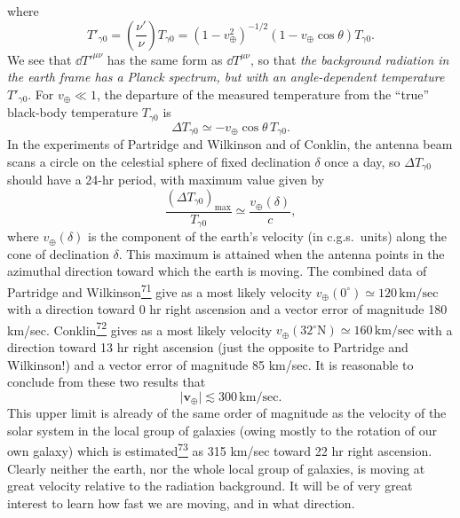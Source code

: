 where
\begin{equation}
  T'_{\gamma0}
  =
  \left(\frac{\nu'}{\nu}\right)T_{\gamma0}
  =
  (1-v_\oplus^2)^{-1/2}
  (1-v_\oplus\cos\theta)T_{\gamma0}.
  \tag{15.5.24}\label{eq:15.5.24}
\end{equation}
We see that \(\dd T'^{\mu\nu}\) has the same form as \(\dd T^{\mu\nu}\), so
that \emph{the background radiation in the earth frame has a Planck spectrum,
but with an angle-dependent temperature \(T'_{\gamma0}\)}. For
\(v_\oplus\ll1\), the departure of the measured temperature from the ``true''
black-body temperature \(T_{\gamma0}\) is
\begin{equation}
  \Delta T_{\gamma0}
  \simeq
  -v_\oplus\cos\theta\,T_{\gamma0}.
  \tag{15.5.25}\label{eq:15.5.25}
\end{equation}
In the experiments of Partridge and Wilkinson and of Conklin, the antenna
beam scans a circle on the celestial sphere of fixed declination \(\delta\)
once a day, so \(\Delta T_{\gamma0}\) should have a 24-hr period, with maximum
value given by
\begin{equation}
  \frac{(\Delta T_{\gamma0})_{\max}}{T_{\gamma0}}
  \simeq
  \frac{v_\oplus(\delta)}{c},
  \tag{15.5.26}\label{eq:15.5.26}
\end{equation}
where \(v_\oplus(\delta)\) is the component of the earth's velocity (in
c.g.s.\ units) along the cone of declination \(\delta\). This maximum is
attained when the antenna points in the azimuthal direction toward which the
earth is moving. The combined data of Partridge and
Wilkinson\hyperref[ch15-ref-71]{\textsuperscript{71}} give as a most likely
velocity \(v_\oplus(0^\circ)\simeq120\,\mathrm{km/sec}\) with a direction
toward 0 hr right ascension and a vector error of magnitude 180 km/sec.
Conklin\hyperref[ch15-ref-72]{\textsuperscript{72}} gives as a most likely
velocity \(v_\oplus(32^\circ\mathrm N)\simeq160\,\mathrm{km/sec}\) with a
direction toward 13 hr right ascension (just the opposite to Partridge and
Wilkinson!) and a vector error of magnitude 85 km/sec. It is reasonable to
conclude from these two results that
\begin{equation}
  \lvert\mathbf v_\oplus\rvert\lesssim300\,\mathrm{km/sec}.
  \tag{15.5.27}\label{eq:15.5.27}
\end{equation}
This upper limit is already of the same order of magnitude as the velocity of
the solar system in the local group of galaxies (owing mostly to the rotation
of our own galaxy) which is
estimated\hyperref[ch15-ref-73]{\textsuperscript{73}} as 315 km/sec toward
22 hr right ascension. Clearly neither the earth, nor the whole local group of
galaxies, is moving at great velocity relative to the radiation background. It
will be of very great interest to learn how fast we are moving, and in what
direction.

